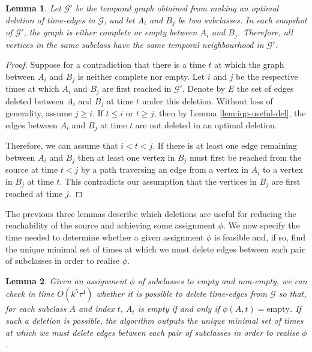 \documentclass[preprint,12pt]{elsarticle}
\newtheorem{lemma}{Lemma}
\begin{document}
\begin{lemma}\label{lem:iqp-full-del-symetric}
    Let $\mathcal{G}'$ be the temporal graph obtained from making an optimal deletion of time-edges in $\mathcal{G}$, and let $A_i$ and $B_j$ be two subclasses.  In each snapshot of $\mathcal{G}'$, the graph is either complete or empty between $A_i$ and $B_j$. Therefore, all vertices in the same subclass have the same temporal neighbourhood in $\mathcal{G}'$.
\end{lemma}
\begin{proof}
    Suppose for a contradiction that there is a time $t$ at which the graph between $A_i$ and $B_j$ is neither complete nor empty. Let $i$ and $j$ be the respective times at which $A_i$ and $B_j$ are first reached in $\mathcal{G}'$.
 Denote by $E$ the set of edges deleted between $A_i$ and $B_j$ at time $t$ under this deletion. Without loss of generality, assume $j\geq i$. If $t\leq i$ or $t\geq j$, then by Lemma \ref{lem:iqp-useful-del}, the edges between $A_i$ and $B_j$ at time $t$ are not deleted in an optimal deletion.
 
 Therefore, we can assume that $i< t< j$.
 If there is at least one edge remaining between $A_i$ and $B_j$ then at least one vertex in $B_j$ must first be reached from the source at time $t<j$ by a path traversing an edge from a vertex in $A_i$ to a vertex in $B_j$ at time $t$. This contradicts our assumption that the vertices in $B_j$ are first reached at time $j$.
\end{proof}
The previous three lemmas describe which deletions are useful for reducing the reachability of the source and achieving some assignment $\phi$. We now specify the time needed to determine whether a given assignment $\phi$ is feasible and, if so, find the unique minimal set of times at which we must delete edges between each pair of subclasses in order to realise $\phi$.
\begin{lemma}\label{lem:iqp-possible-phi}
    Given an assignment $\phi$ of subclasses to empty and non-empty, we can check in time $O(k^5\tau^4)$ whether it is possible to delete time-edges from $\mathcal{G}$ so that, for each subclass $A$ and index $t$, $A_t$ is empty if and only if $\phi(A,t)=\text{empty}$. If such a deletion is possible, the algorithm outputs the unique minimal set of times at which we must delete edges between each pair of subclasses in order to realise $\phi$.
\end{lemma}
\end{document}

